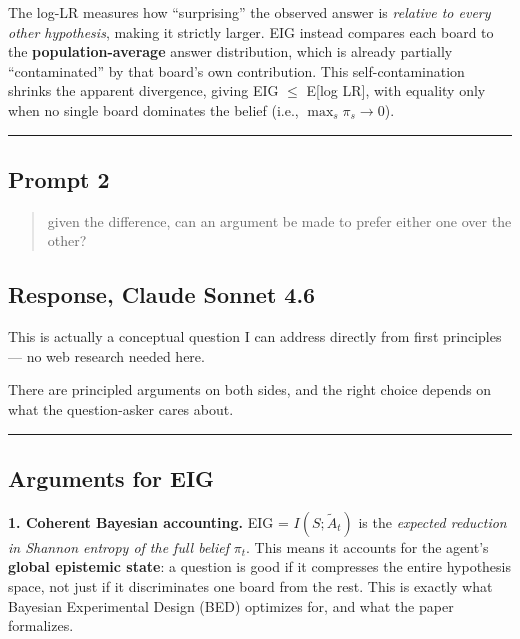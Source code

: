 \documentclass[
]{article}
\begin{document}
The log-LR measures how ``surprising'' the observed answer is
\emph{relative to every other hypothesis}, making it strictly larger.
EIG instead compares each board to the \textbf{population-average}
answer distribution, which is already partially ``contaminated'' by that
board's own contribution. This self-contamination shrinks the apparent
divergence, giving EIG \(\leq\) E{[}log LR{]}, with equality only when
no single board dominates the belief (i.e., \(\max_s \pi_s \to 0\)).

\begin{center}\rule{0.5\linewidth}{0.5pt}\end{center}

\subsection{Prompt 2}\label{prompt-2}

\begin{quote}
given the difference, can an argument be made to prefer either one over
the other?
\end{quote}

\subsection{Response, Claude Sonnet
4.6}\label{response-claude-sonnet-4.6-1}

This is actually a conceptual question I can address directly from first
principles --- no web research needed here.

There are principled arguments on both sides, and the right choice
depends on what the question-asker cares about.

\begin{center}\rule{0.5\linewidth}{0.5pt}\end{center}

\subsection{Arguments for EIG}\label{arguments-for-eig}

\textbf{1. Coherent Bayesian accounting.} EIG = \(I(S;\tilde{A}_t)\) is
the \emph{expected reduction in Shannon entropy of the full belief}
\(\pi_t\). This means it accounts for the agent's \textbf{global
epistemic state}: a question is good if it compresses the entire
hypothesis space, not just if it discriminates one board from the rest.
This is exactly what Bayesian Experimental Design (BED) optimizes for,
and what the paper formalizes.
\end{document}

